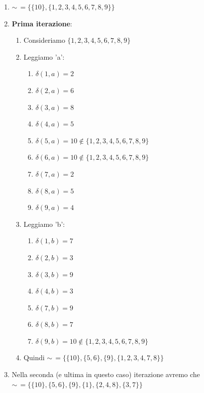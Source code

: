 \documentclass[12pt, a4paper]{report}
\begin{document}
\begin{example}
\begin{enumerate}
\begin{center}
                        \end{center}
                        \item $\sim\,=\{\{10\},\{1,2,3,4,5,6,7,8,9\}\}$
                        \item \textbf{Prima iterazione}: \begin{enumerate}
                            \item Consideriamo $\{1,2,3,4,5,6,7,8,9\}$
                            \item Leggiamo 'a': \begin{enumerate}
                                \item $\delta(1,a)=2$
                                \item $\delta(2,a)=6$
                                \item $\delta(3,a)=8$
                                \item $\delta(4,a)=5$
                                \item $\delta(5,a)=10\notin\{1,2,3,4,5,6,7,8,9\}$
                                \item $\delta(6,a)=10\notin\{1,2,3,4,5,6,7,8,9\}$
                                \item $\delta(7,a)=2$
                                \item $\delta(8,a)=5$
                                \item $\delta(9,a)=4$
                            \end{enumerate}
                            \item Leggiamo 'b': \begin{enumerate}
                                \item $\delta(1,b)=7$
                                \item $\delta(2,b)=3$
                                \item $\delta(3,b)=9$
                                \item $\delta(4,b)=3$
                                \item $\delta(7,b)=9$
                                \item $\delta(8,b)=7$
                                \item $\delta(9,b)=10\notin\{1,2,3,4,5,6,7,8,9\}$
                            \end{enumerate}
                            \item Quindi $\sim\,=\{\{10\},\{5,6\},\{9\},\{1,2,3,4,7,8\}\}$
                        \end{enumerate}
                        \item Nella seconda (e ultima in questo caso) iterazione avremo che $\sim\,=\{\{10\},\{5,6\},\{9\},\{1\},\{2,4,8\},\{3,7\}\}$
                    \end{enumerate}
                \end{example}
\end{document}
